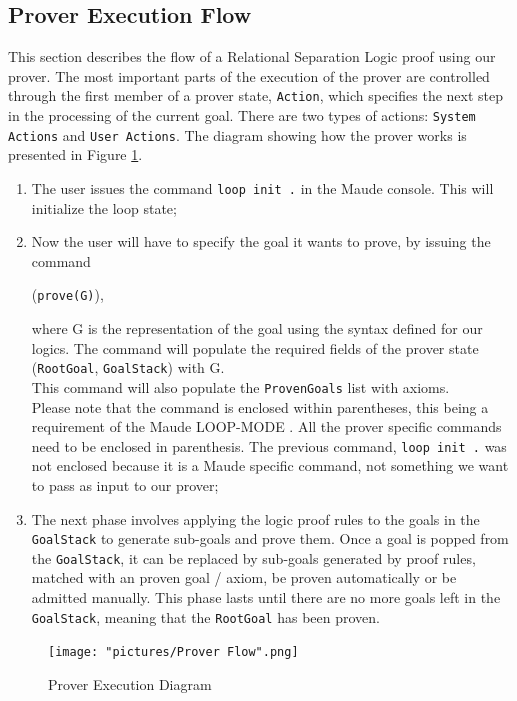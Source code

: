 \documentclass[12pt,a4paper]{article}
\begin{document}
\subsection{Prover Execution Flow}
This section describes the flow of a Relational Separation Logic proof using our prover. The most important parts of the execution of the prover are controlled through the first member of a prover state, \texttt{Action}, which specifies the next step in the processing of the current goal. There are two types of actions: \texttt{System Actions} and \texttt{User Actions}. The diagram showing how the prover works is presented in Figure \ref{fig:ProverDiagram}.
\\
\begin{enumerate}
	\item The user issues the command \texttt{loop init .} in the Maude console. This will initialize the loop state;
	\item Now the user will have to specify the goal it wants to prove, by issuing the command \begin{center}(\texttt{prove(G)}),\end{center} where G is the representation of the goal using the syntax defined for our logics. The command will populate the required fields of the prover state (\texttt{RootGoal}, \texttt{GoalStack}) with G.
	\\
	
	This command will also populate the \texttt{ProvenGoals} list with axioms.
	\\
	
	Please note that the command is enclosed within parentheses, this being a requirement of the  Maude LOOP-MODE \cite{manual}. All the prover specific commands need to be enclosed in parenthesis. The previous command, \texttt{loop init .} was not enclosed because it is a Maude specific command, not something we want to pass as input to our prover;
	\item The next phase involves applying the logic proof rules to the goals in the \texttt{GoalStack} to generate sub-goals and prove them. Once a goal is popped from the \texttt{GoalStack}, it can be replaced by sub-goals generated by proof rules, matched with an proven goal / axiom, be proven automatically or be admitted manually. This phase lasts until there are no more goals left in the \texttt{GoalStack}, meaning that the \texttt{RootGoal} has been proven.
\end{enumerate}
\begin{figure}[h!]
	\texttt{[image: "pictures/Prover Flow".png]}
	\caption{Prover Execution Diagram}
	\label{fig:ProverDiagram}
\end{figure} 
\clearpage
\end{document}
